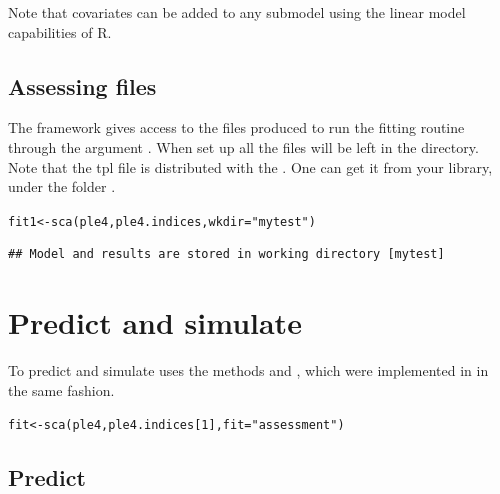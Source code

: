 \documentclass[a4paper,english,10pt]{article}\usepackage[]{graphicx}\usepackage[]{color}
\makeatletter
\newcommand{\hlnum}[1]{\textcolor[rgb]{0.063,0.58,0.627}{#1}}%
\newcommand{\hlstr}[1]{\textcolor[rgb]{0.063,0.58,0.627}{#1}}%
\newcommand{\hlstd}[1]{\textcolor[rgb]{0.196,0.196,0.196}{#1}}%
\newcommand{\hlkwb}[1]{\textcolor[rgb]{0.627,0,0.314}{#1}}%
\newcommand{\hlkwc}[1]{\textcolor[rgb]{0,0.631,0.314}{#1}}%
\newcommand{\hlkwd}[1]{\textcolor[rgb]{0.78,0.227,0.412}{#1}}%
\newenvironment{kframe}{%
 \def\at@end@of@kframe{}%
 \ifinner\ifhmode%
  \def\at@end@of@kframe{\end{minipage}}%
  \begin{minipage}{\columnwidth}%
 \fi\fi%
 \def\FrameCommand##1{\hskip\@totalleftmargin \hskip-\fboxsep
 \colorbox{shadecolor}{##1}\hskip-\fboxsep
     \hskip-\linewidth \hskip-\@totalleftmargin \hskip\columnwidth}%
 \MakeFramed {\advance\hsize-\width
   \@totalleftmargin\z@ \linewidth\hsize
   \@setminipage}}%
 {\par\unskip\endMakeFramed%
 \at@end@of@kframe}
\newenvironment{knitrout}{}{} %
\makeatother
\begin{document}
Note that covariates can be added to any submodel using the linear model capabilities of R.

\subsection{Assessing  files}

The framework gives access to the files produced to run the  fitting routine through the argument . When set up all the  files will be left in the directory. Note that the  tpl file is distributed with the . One can get it from your  library, under the folder .

\begin{knitrout}
\color{fgcolor}\begin{kframe}
\begin{alltt}
\hlstd{fit1} \hlkwb{<-} \hlkwd{sca}\hlstd{(ple4, ple4.indices,} \hlkwc{wkdir} \hlstd{=} \hlstr{"mytest"}\hlstd{)}
\end{alltt}
\begin{verbatim}
## Model and results are stored in working directory [mytest]
\end{verbatim}
\end{kframe}
\end{knitrout}

\section{Predict and simulate}

To predict and simulate  uses the methods  and , which were implemented in  in the same fashion.

\begin{knitrout}
\color{fgcolor}\begin{kframe}
\begin{alltt}
\hlstd{fit} \hlkwb{<-} \hlkwd{sca}\hlstd{(ple4, ple4.indices[}\hlnum{1}\hlstd{],} \hlkwc{fit} \hlstd{=} \hlstr{"assessment"}\hlstd{)}
\end{alltt}
\end{kframe}
\end{knitrout}

\subsection{Predict}
\end{document}
